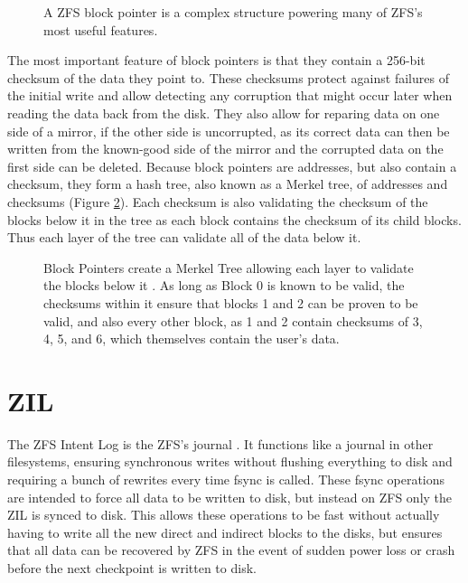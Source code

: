 \begin{figure}[H]
    \centering
    \resizebox{0.75\linewidth}{!}{}
    \captionsetup{width=0.75\linewidth}
    \caption{A ZFS block pointer is a complex structure powering many of ZFS's most useful features\cite{ahrens_openzfs_basics}.}
\label{fig:BlockPointer}
\end{figure}

The most important feature of block pointers is that they contain a 256-bit checksum of the data they point to.
These checksums protect against failures of the initial write and allow detecting any corruption that might occur later
when reading the data back from the disk.
They also allow for reparing data on one side of a mirror, if the other side is uncorrupted, 
as its correct data can then be written from the known-good side of the mirror and the corrupted data on the first side 
can be deleted.
Because block pointers are addresses, but also contain a checksum, they form a hash tree, also known as a Merkel tree, of addresses and checksums
(Figure \ref{fig:HashTree}).
Each checksum is also validating the checksum of the blocks below it in the tree as each block contains the checksum of
its child blocks.
Thus each layer of the tree can validate all of the data below it.

\begin{figure}[H]
    \centering
    \resizebox{0.75\linewidth}{!}{}
    \captionsetup{width=0.75\linewidth}
    \caption{
        Block Pointers create a Merkel Tree allowing each layer to validate the blocks below it
        \cite{azaghal_diagram_2012}. 
        As long as Block 0 is known to be valid, the checksums within it ensure that blocks 1 and 2 can be proven to be valid, 
        and also every other block, as 1 and 2 contain checksums of 3, 4, 5, and 6, which themselves contain the user's data.
    }
\label{fig:HashTree}
\end{figure}

\section{ZIL}
The ZFS Intent Log is the ZFS's journal  \cite{ahrens_read_write}.
It functions like a journal in other filesystems, ensuring synchronous writes without flushing everything to disk and 
requiring a bunch of rewrites every time fsync is called. 
These fsync operations are intended to force all data to be written to disk,
but instead on ZFS only the ZIL is synced to disk.
This allows these operations to be fast without actually having to write all the new direct and indirect blocks to the disks,
but ensures that all data can be recovered by ZFS in the event of sudden power loss or crash before
the next checkpoint is written to disk.

